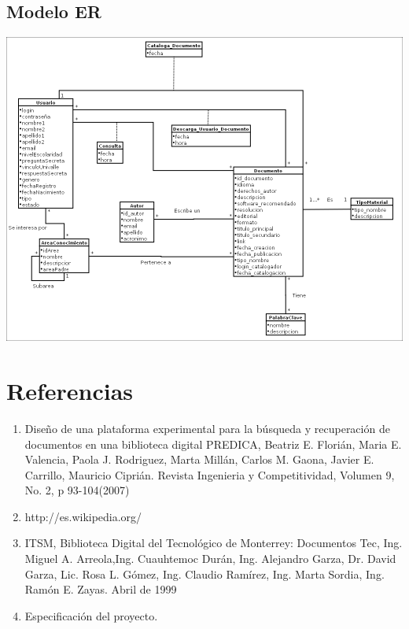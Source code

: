 \documentclass[]{article}
\begin{document}
	\subsection{Modelo ER}
		\begin{minipage}[c]{1\linewidth}
			\centering
			\includegraphics[scale=.48]{ModeloDatos}
		\end{minipage} 
			
\section{Referencias}
	\begin{enumerate}
		\item Diseño de una plataforma experimental para la búsqueda y recuperación de documentos
		 en una biblioteca digital PREDICA, Beatriz E. Florián, Maria E. Valencia, Paola J. 
		 Rodriguez, Marta Millán, Carlos M. Gaona, Javier E. Carrillo, Mauricio Ciprián. Revista
		 Ingenieria y Competitividad, Volumen 9, No. 2, p 93-104(2007)
		 
		\item http://es.wikipedia.org/
		
		\item ITSM, Biblioteca Digital del Tecnológico de Monterrey: Documentos Tec, 
		Ing. Miguel A. Arreola,Ing. Cuauhtemoc Durán, Ing. Alejandro Garza, 
		Dr. David Garza, Lic. Rosa L. Gómez, Ing. Claudio Ramírez, Ing. Marta Sordia,
		Ing. Ramón E. Zayas. Abril de 1999		
		
		\item Especificación del proyecto.
	\end{enumerate}		
			
\end{document}
